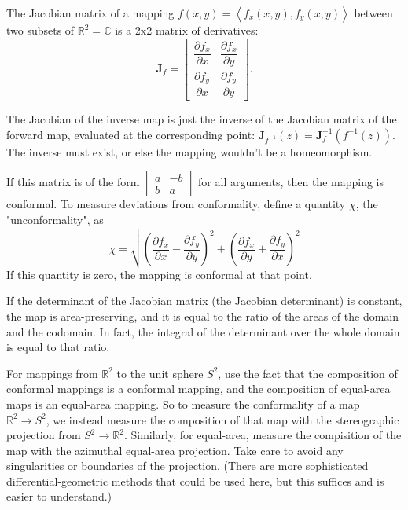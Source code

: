 \documentclass{amsart}[12pt]
\begin{document}
The Jacobian matrix of a mapping $f(x,y) = \left<f_x(x,y), f_y(x,y)\right>$
between two subsets of $\mathbb{R}^2 = \mathbb{C}$ is a 2x2 matrix of
derivatives:
\begin{equation}
\mathbf{J}_f =
\begin{bmatrix}
    \dfrac{\partial f_x}{\partial x} & \dfrac{\partial f_x}{\partial y}\\
    \dfrac{\partial f_y}{\partial x} & \dfrac{\partial f_y}{\partial y}
\end{bmatrix}.
\end{equation}

The Jacobian of the inverse map is just the inverse of the Jacobian matrix of the
forward map, evaluated at the corresponding point: $\mathbf{J}_{f^{-1}} (z)
=\mathbf{J}_{f}^{-1} \left(f^{-1}(z)\right)$. The inverse must exist,
or else the mapping wouldn't be a homeomorphism.

If this matrix is of the form $\begin{bmatrix} a & -b\\ b & a \end{bmatrix}$
for all arguments, then the mapping is conformal. To measure deviations from
conformality, define a quantity $\chi$, the "unconformality", as
\begin{equation}
\chi = \sqrt{\left(\dfrac{\partial f_x}{\partial x} -
\dfrac{\partial f_y}{\partial y}\right)^2 +
\left(\dfrac{\partial f_x}{\partial y} +
\dfrac{\partial f_y}{\partial x}\right)^2}
\end{equation}
If this quantity is zero, the mapping is conformal at that point.

If the determinant of the Jacobian matrix (the Jacobian determinant) is constant,
the map is area-preserving, and it is equal to the ratio of the areas of the
domain and the codomain. In fact, the integral of the determinant over the whole
domain is equal to that ratio.

For mappings from $\mathbb{R}^2$ to the unit sphere $S^2$, use the fact that
the composition of conformal mappings is a conformal mapping, and the
composition of equal-area maps is an equal-area mapping. So to measure the
conformality of a map $\mathbb{R}^2 \to S^2$, we instead measure the composition
of that map with the stereographic projection from $S^2 \to \mathbb{R}^2$.
Similarly, for equal-area, measure the compisition of the map with the azimuthal
equal-area projection. Take care to avoid any singularities or boundaries of the
projection. (There are more sophisticated differential-geometric methods that
could be used here, but this suffices and is easier to understand.)
\end{document}
